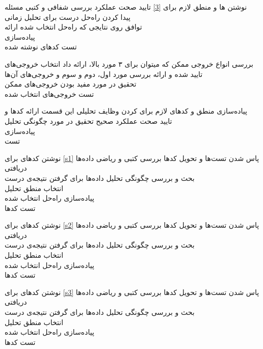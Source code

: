 \begin{wbsbox}{}
\begin{wbssub}
{نوشتن ها و منطق لازم برای \ref{3}}
{تایید صحت عملکرد}
\task 
بررسی شفافی و کتبی مسئله \\
\task
پیدا کردن راه‌حل درست برای تحلیل زمانی \\
\task
توافق روی نتایجی که راه‌حل انتخاب شده ارائه \\
\task
پیاده‌سازی \\
\task
تست کد‌‌های نوشته شده
\end{wbssub}

\begin{wbssub}
{بررسی انواع خروجی ممکن که میتوان برای ۳ مورد بالا، ارائه داد}
{انتخاب خروجی‌های تایید شده و ارائه}
\task
بررسی مورد اول، دوم و سوم و خروجی‌های آن‌ها \\
\task
تحقیق در مورد مفید بودن خروجی‌های ممکن \\
\task
تست خروجی‌های انتخاب شده
\end{wbssub}

\begin{wbssub}
{پیاده‌سازی منطق‌ و کد‌های لازم برای  کردن وظایف تحلیلی این قسمت}
{ارائه کد‌‌ها و تایید صحت عملکرد صحیح}
\task
تحقیق در مورد چگونگی تحلیل \\
\task
پیاده‌سازی \\
\task
تست
\end{wbssub}

\begin{wbssub}
{نوشتن کد‌های  برای \ref{s1}}
{پاس شدن تست‌ها و تحویل کد‌ها}
\task 
بررسی کتبی و ریاضی داده‌ها دریافتی \\
\task
بحث و بررسی چگونگی تحلیل‌ داده‌ها برای گرفتن نتیجه‌ی درست \\
\task
انتخاب منطق تحلیل \\
\task
پیاده‌سازی راه‌حل انتخاب شده \\
\task
تست کد‌ها
\end{wbssub}

\begin{wbssub}
{نوشتن کد‌های  برای \ref{s2}}
{پاس شدن تست‌ها و تحویل کد‌ها}
\task 
بررسی کتبی و ریاضی داده‌ها دریافتی \\
\task
بحث و بررسی چگونگی تحلیل‌ داده‌ها برای گرفتن نتیجه‌ی درست \\
\task
انتخاب منطق تحلیل \\
\task
پیاده‌سازی راه‌حل انتخاب شده \\
\task
تست کد‌ها
\end{wbssub}

\begin{wbssub}
{نوشتن کد‌های  برای \ref{s3}}
{پاس شدن تست‌ها و تحویل کد‌ها}
\task 
بررسی کتبی و ریاضی داده‌ها دریافتی \\
\task
بحث و بررسی چگونگی تحلیل‌ داده‌ها برای گرفتن نتیجه‌ی درست \\
\task
انتخاب منطق تحلیل \\
\task
پیاده‌سازی راه‌حل انتخاب شده \\
\task
تست کد‌ها
\end{wbssub}
\end{wbsbox}
